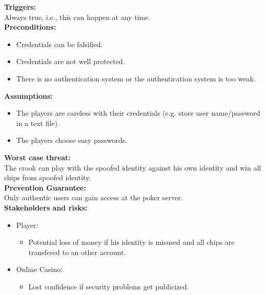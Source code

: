 \documentclass[a4paper,11pt]{report}
\begin{document}
\textbf{Triggers:}\\
Always true, i.e., this can happen at any time. \\
\textbf{Preconditions:}
\begin{itemize}
\item Credentials can be falsified.
\item Credentials are not well protected.
\item There is no authentication system or the authentication system is too weak.
\end{itemize}
\textbf{Assumptions:}
\begin{itemize}
\item The players are careless with their credentials (e.g. store user name/password in a text file).
\item The players choose easy passwords.
\end{itemize}
\textbf{Worst case threat:}\\
The crook can play with the spoofed identity against his own identity and win all chips from spoofed identity. \\
\textbf{Prevention Guarantee:} \\
Only authentic users can gain access at the poker server. \\
\textbf{Stakeholders and risks:}
\begin{itemize}
\item Player:
\begin{itemize}
\item Potential loss of money if his identity is misused and all chips are transfered to an other account.
\end{itemize}
\item Online Casino:
\begin{itemize}
\item Lost confidence if security problems get publicized.
\end{itemize}
\end{itemize}
\end{document}

